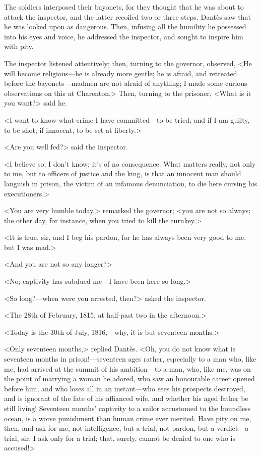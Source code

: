  The soldiers interposed their bayonets, for they thought that he was about to attack the inspector, and the latter recoiled two or three steps. Dantès saw that he was looked upon as dangerous. Then, infusing all the humility he possessed into his eyes and voice, he addressed the inspector, and sought to inspire him with pity. 

 The inspector listened attentively; then, turning to the governor, observed, <He will become religious—he is already more gentle; he is afraid, and retreated before the bayonets—madmen are not afraid of anything; I made some curious observations on this at Charenton.> Then, turning to the prisoner, <What is it you want?> said he. 

 <I want to know what crime I have committed—to be tried; and if I am guilty, to be shot; if innocent, to be set at liberty.> 

 <Are you well fed?> said the inspector. 

 <I believe so; I don't know; it's of no consequence. What matters really, not only to me, but to officers of justice and the king, is that an innocent man should languish in prison, the victim of an infamous denunciation, to die here cursing his executioners.> 

 <You are very humble today,> remarked the governor; <you are not so always; the other day, for instance, when you tried to kill the turnkey.> 

 <It is true, sir, and I beg his pardon, for he has always been very good to me, but I was mad.> 

 <And you are not so any longer?> 

 <No; captivity has subdued me—I have been here so long.> 

 <So long?—when were you arrested, then?> asked the inspector. 

 <The 28th of February, 1815, at half-past two in the afternoon.> 

 <Today is the 30th of July, 1816,—why, it is but seventeen months.> 

 <Only seventeen months,> replied Dantès. <Oh, you do not know what is seventeen months in prison!—seventeen ages rather, especially to a man who, like me, had arrived at the summit of his ambition—to a man, who, like me, was on the point of marrying a woman he adored, who saw an honourable career opened before him, and who loses all in an instant—who sees his prospects destroyed, and is ignorant of the fate of his affianced wife, and whether his aged father be still living! Seventeen months' captivity to a sailor accustomed to the boundless ocean, is a worse punishment than human crime ever merited. Have pity on me, then, and ask for me, not intelligence, but a trial; not pardon, but a verdict—a trial, sir, I ask only for a trial; that, surely, cannot be denied to one who is accused!> 

